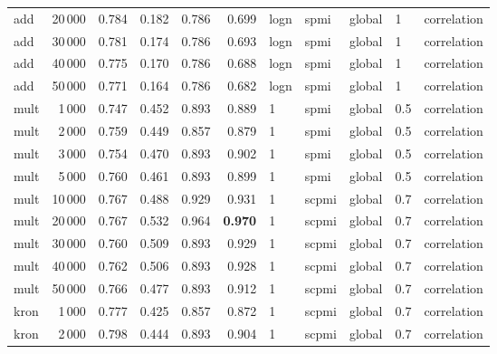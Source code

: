 \begin{tabular}{lrrrrrlllll}
     add &           20\,000 &  0.784 &  0.182 &      0.786 &          0.699 &  logn &   spmi &  global &    1 &    correlation \\
     add &           30\,000 &  0.781 &  0.174 &      0.786 &          0.693 &  logn &   spmi &  global &    1 &    correlation \\
     add &           40\,000 &  0.775 &  0.170 &      0.786 &          0.688 &  logn &   spmi &  global &    1 &    correlation \\
     add &           50\,000 &  0.771 &  0.164 &      0.786 &          0.682 &  logn &   spmi &  global &    1 &    correlation \\ \addlinespace
    mult &            1\,000 &  0.747 &  0.452 &      0.893 &          0.889 &     1 &   spmi &  global &  0.5 &    correlation \\
    mult &            2\,000 &  0.759 &  0.449 &      0.857 &          0.879 &     1 &   spmi &  global &  0.5 &    correlation \\
    mult &            3\,000 &  0.754 &  0.470 &      0.893 &          0.902 &     1 &   spmi &  global &  0.5 &    correlation \\
    mult &            5\,000 &  0.760 &  0.461 &      0.893 &          0.899 &     1 &   spmi &  global &  0.5 &    correlation \\
    mult &           10\,000 &  0.767 &  0.488 &      0.929 &          0.931 &     1 &  scpmi &  global &  0.7 &    correlation \\
    mult &           20\,000 &  0.767 &  0.532 &      0.964 &          \textbf{0.970} &     1 &  scpmi &  global &  0.7 &    correlation \\
    mult &           30\,000 &  0.760 &  0.509 &      0.893 &          0.929 &     1 &  scpmi &  global &  0.7 &    correlation \\
    mult &           40\,000 &  0.762 &  0.506 &      0.893 &          0.928 &     1 &  scpmi &  global &  0.7 &    correlation \\
    mult &           50\,000 &  0.766 &  0.477 &      0.893 &          0.912 &     1 &  scpmi &  global &  0.7 &    correlation \\ \addlinespace
    kron &            1\,000 &  0.777 &  0.425 &      0.857 &          0.872 &     1 &  scpmi &  global &  0.7 &    correlation \\
    kron &            2\,000 &  0.798 &  0.444 &      0.893 &          0.904 &     1 &  scpmi &  global &  0.7 &    correlation \\

\end{tabular}
